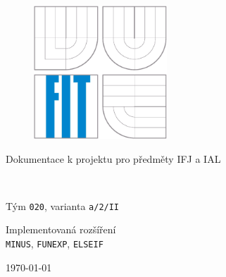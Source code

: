 \begin{titlepage}

\begin{figure}[!h]
  \centering
  \includegraphics[height=5cm]{img/logo.eps}
\end{figure}

\vfill

\begin{center}
\begin{Large}
Dokumentace k projektu pro předměty IFJ a IAL\\
\end{Large}
\bigskip
\begin{Huge}
\projname\\
\end{Huge}
\begin{large}
Tým \texttt{020}, varianta \texttt{a/2/II}
\end{large}
\end{center}

\vspace{4pt}

\begin{center}
\begin{large}
Implementovaná rozšíření \\
\texttt{MINUS}, \texttt{FUNEXP}, \texttt{ELSEIF}
\end{large}
\end{center}

\vfill

\begin{center}
\begin{Large}
\today
\end{Large}
\end{center}

\vfill


\end{titlepage}

